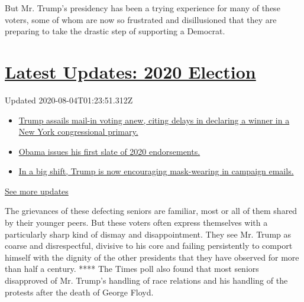 But Mr. Trump's presidency has been a trying experience for many of
these voters, some of whom are now so frustrated and disillusioned that
they are preparing to take the drastic step of supporting a Democrat.

\hypertarget{latest-updates-2020-election}{%
\section{\texorpdfstring{\href{https://www.nytimes3xbfgragh.onion/2020/08/03/us/elections/biden-vs-trump.html?action=click\&pgtype=Article\&state=default\&region=MAIN_CONTENT_1\&context=storylines_live_updates}{Latest
Updates: 2020
Election}}{Latest Updates: 2020 Election}}\label{latest-updates-2020-election}}

Updated 2020-08-04T01:23:51.312Z

\begin{itemize}
\tightlist
\item
  \href{https://www.nytimes3xbfgragh.onion/2020/08/03/us/elections/biden-vs-trump.html?action=click\&pgtype=Article\&state=default\&region=MAIN_CONTENT_1\&context=storylines_live_updates\#link-6494b448}{Trump
  assails mail-in voting anew, citing delays in declaring a winner in a
  New York congressional primary.}
\item
  \href{https://www.nytimes3xbfgragh.onion/2020/08/03/us/elections/biden-vs-trump.html?action=click\&pgtype=Article\&state=default\&region=MAIN_CONTENT_1\&context=storylines_live_updates\#link-3de249e6}{Obama
  issues his first slate of 2020 endorsements.}
\item
  \href{https://www.nytimes3xbfgragh.onion/2020/08/03/us/elections/biden-vs-trump.html?action=click\&pgtype=Article\&state=default\&region=MAIN_CONTENT_1\&context=storylines_live_updates\#link-54e34d20}{In
  a big shift, Trump is now encouraging mask-wearing in campaign
  emails.}
\end{itemize}

\href{https://www.nytimes3xbfgragh.onion/2020/08/03/us/elections/biden-vs-trump.html?action=click\&pgtype=Article\&state=default\&region=MAIN_CONTENT_1\&context=storylines_live_updates}{See
more updates}

The grievances of these defecting seniors are familiar, most or all of
them shared by their younger peers. But these voters often express
themselves with a particularly sharp kind of dismay and disappointment.
They see Mr. Trump as coarse and disrespectful, divisive to his core and
failing persistently to comport himself with the dignity of the other
presidents that they have observed for more than half a century. ****
The Times poll also found that most seniors disapproved of Mr. Trump's
handling of race relations and his handling of the protests after the
death of George Floyd.

